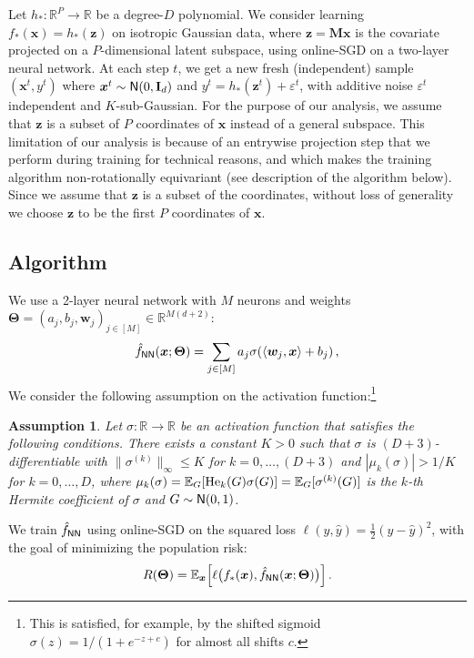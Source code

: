 \documentclass[11pt]{article}
\newcommand{\E}{\mathbb{E}}
\newcommand{\R}{\mathbb{R}}
\newcommand{\eps}{\varepsilon}
\def\id{{\mathbf I}}
\newcommand{\<}{\langle}
\renewcommand{\>}{\rangle}
\newtheorem{assumption}{Assumption}
\theoremstyle{definition}
\def\bM{{\boldsymbol M}}
\def\bw{{\boldsymbol w}}
\def\bx{{\boldsymbol x}}
\def\bz{{\boldsymbol z}}
\def\bTheta{{\boldsymbol \Theta}}
\def\hf{{\hat f}}
\def\normal{{\sf N}}
\def\NN{{\sf NN}}
\def\normal{{\sf N}}
\def\normal{{\sf N}}
\def\NN{{\sf NN}}
\def\bz{{\boldsymbol z}}
\def\He{{\rm He}}
\def\bTheta{{\boldsymbol \Theta}}
\def\NN{{\sf NN}}
\def\bw{{\boldsymbol w}}
\def\bx{{\boldsymbol x}}
\def\bz{{\boldsymbol z}}
\def\He{{\rm He}}
\def\normal{{\sf N}}
\def\bTheta{{\boldsymbol \Theta}}
\def\hf{\hat f}
\def\eps{\varepsilon}
\begin{document}
Let $h_* : \R^P \to \R$ be a degree-$D$ polynomial. We consider learning $f_* (\bx) = h_* (\bz)$ on isotropic Gaussian data, where $\bz = \bM \bx$ is the covariate projected on a $P$-dimensional latent subspace, using online-SGD on a two-layer neural network. At each step $t$, we get a new fresh (independent) sample $(\bx^t, y^t)$ where $\bx^t \sim \normal (0,\id_d)$ and $y^t = h_*(\bz^t) + \eps^t$, with additive noise $\eps^t$ independent and $K$-sub-Gaussian. For the purpose of our analysis, we assume that $\bz$ is a subset of $P$ coordinates of $\bx$ instead of a general subspace. This limitation of our analysis is because of an entrywise projection step that we perform during training for technical reasons, and which makes the training algorithm non-rotationally equivariant (see description of the algorithm below). Since we assume that $\bz$ is a subset of the coordinates, without loss of generality we choose $\bz$ to be the first $P$ coordinates of $\bx$. 


\subsection{Algorithm}

We use a 2-layer neural network with $M$ neurons and weights $\bTheta = (a_j,b_j,\bw_j)_{j \in [M]} \in \R^{M (d+2)}$:
\begin{equation}\label{eq:2-NN}
\hf_{\NN} (\bx ; \bTheta) =  \sum_{j \in [M]}  a_j \sigma ( \< \bw_j , \bx \> + b_j) \, ,
\end{equation}
    We consider the following assumption on the activation function:\footnote{This is satisfied, for example, by the shifted sigmoid $\sigma(z) = 1 / (1 + e^{-z+c})$ for almost all shifts $c$.}
\begin{assumption}%
\label{ass:sigma_I} Let $\sigma : \R \to \R$ be an activation function that satisfies the following conditions. There exists a constant $K>0$ such that $\sigma$ is $(D+3)$-differentiable with $\| \sigma^{(k)} \|_{\infty} \leq K$ for $k = 0 , \ldots , (D+3)$ and $| \mu_k (\sigma) | > 1/K$ for $k = 0 , \ldots , D$, where $\mu_k (\sigma) = \E_G [ \He_k (G) \sigma(G) ] = \E_G [ \sigma^{(k)} (G) ] $ is the $k$-th Hermite coefficient of $\sigma$ and $G \sim \normal (0,1)$.
\end{assumption}



We train $\hf_{\NN}$ using online-SGD on the squared loss $\ell ( y, \hat y) =  \frac{1}{2} (y - \hat{y})^2$, with the goal of minimizing the population risk:
\begin{equation}\label{eq:test_error}
R ( \bTheta ) = \E_{\bx} \Big[ \ell \big( f_* (\bx) , \hf_{\NN} ( \bx ; \bTheta ) \big) \Big] \, .
\end{equation}
\end{document}
